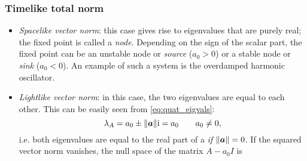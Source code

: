 \subsubsection*{Timelike total norm}
    \begin{itemize}
        \item[\circled{4}] \emph{Spacelike vector norm}: this case gives rise to eigenvalues that are purely real; the fixed point is called a \emph{node}. Depending on the sign of the scalar part, the fixed point can be an unstable node or \emph{source} (\(a_0 > 0\)) or a stable node or \emph{sink} (\(a_0 < 0\)). An example of such a system is the overdamped harmonic oscillator.
        \item[\circled{5}] \emph{Lightlike vector norm}: in this case, the two eigenvalues are equal to each other. This can be easily seen from \cref{eq:quat_eigvals}: 
            \begin{equation}
                \lambda_A = a_0 \pm \norm{\vec{a}}\ii = a_0\qquad a_0 \neq 0,
            \end{equation}
        i.e. both eigenvalues are equal to the real part of a \emph{if} $\norm{\vec{a}} = 0$. 
        If the squared vector norm vanishes, the null space of the matrix $A - a_0 I$ is


\end{itemize}
